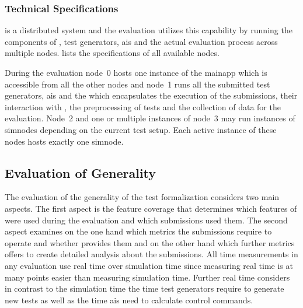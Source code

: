 \subsubsection{Technical Specifications}
\drivebuild{} is a distributed system and the evaluation utilizes this capability by running the components of \drivebuild{}, test generators, \glspl{ai} and the actual evaluation process across multiple nodes.
 lists the specifications of all available nodes.
\begin{table}
    \caption{%
        Node specifications --- Lists the specifications for all (virtual) nodes that were used for the evaluation.
    }\label{tab:nodeSpecifications}
    \medskip
    
\end{table}
During the evaluation node~0 hosts one instance of the \gls{mainapp} which is accessible from all the other nodes and node~1 runs all the submitted test generators, \glspl{ai} and the \submissiontester{} which encapsulates the execution of the submissions, their interaction with \drivebuild{}, the preprocessing of tests and the collection of data for the evaluation.
Node~2 and one or multiple instances of node~3 may run instances of \glspl{simnode} depending on the current test setup.
Each active instance of these nodes hosts exactly one \gls{simnode}.

\subsection{Evaluation of Generality}\label{subsec:evaluationOfGenerality}
The evaluation of the generality of the test formalization considers two main aspects.
The first aspect is the feature coverage that determines which features of \drivebuild{} were used during the evaluation and which submissions used them.
The second aspect examines on the one hand which metrics the submissions require to operate and whether \drivebuild{} provides them and on the other hand which further metrics \drivebuild{} offers to create detailed analysis about the submissions.
All time measurements in any evaluation use real time over simulation time since measuring real time is at many points easier than measuring simulation time.
Further real time considers in contrast to the simulation time the time test generators require to generate new tests as well as the time \glspl{ai} need to calculate control commands.
